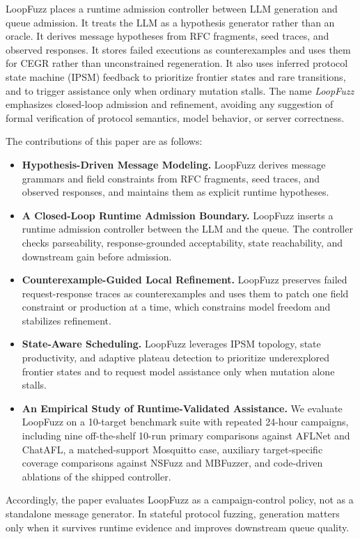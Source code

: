 \documentclass[conference]{IEEEtran}
\begin{document}
LoopFuzz places a runtime admission controller between LLM generation and queue admission. It treats the LLM as a hypothesis generator rather than an oracle. It derives message hypotheses from RFC fragments, seed traces, and observed responses. It stores failed executions as counterexamples and uses them for CEGR rather than unconstrained regeneration. It also uses inferred protocol state machine (IPSM) feedback to prioritize frontier states and rare transitions, and to trigger assistance only when ordinary mutation stalls. The name \emph{LoopFuzz} emphasizes closed-loop admission and refinement, avoiding any suggestion of formal verification of protocol semantics, model behavior, or server correctness.

The contributions of this paper are as follows:
\begin{itemize}
    \item \textbf{Hypothesis-Driven Message Modeling.} LoopFuzz derives message grammars and field constraints from RFC fragments, seed traces, and observed responses, and maintains them as explicit runtime hypotheses.
    \item \textbf{A Closed-Loop Runtime Admission Boundary.} LoopFuzz inserts a runtime admission controller between the LLM and the queue. The controller checks parseability, response-grounded acceptability, state reachability, and downstream gain before admission.
    \item \textbf{Counterexample-Guided Local Refinement.} LoopFuzz preserves failed request-response traces as counterexamples and uses them to patch one field constraint or production at a time, which constrains model freedom and stabilizes refinement.
    \item \textbf{State-Aware Scheduling.} LoopFuzz leverages IPSM topology, state productivity, and adaptive plateau detection to prioritize underexplored frontier states and to request model assistance only when mutation alone stalls.
    \item \textbf{An Empirical Study of Runtime-Validated Assistance.} We evaluate LoopFuzz on a 10-target benchmark suite with repeated 24-hour campaigns, including nine off-the-shelf 10-run primary comparisons against AFLNet and ChatAFL, a matched-support Mosquitto case, auxiliary target-specific coverage comparisons against NSFuzz and MBFuzzer, and code-driven ablations of the shipped controller.
\end{itemize}

Accordingly, the paper evaluates LoopFuzz as a campaign-control policy, not as a standalone message generator. In stateful protocol fuzzing, generation matters only when it survives runtime evidence and improves downstream queue quality.
\end{document}
